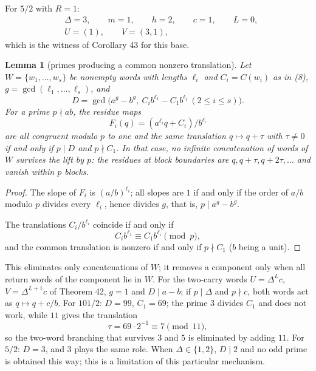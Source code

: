 \documentclass[11pt,reqno]{amsart}
\newtheorem{lemma}[theorem]{Lemma}
\theoremstyle{definition}
\theoremstyle{remark}
\begin{document}
For \(5/2\) with \(R=1\):
\[
\begin{aligned}
&\Delta=3,\qquad m=1,\qquad h=2,\qquad c=1,\qquad L=0,\\
&U=(1),\qquad V=(3,1),
\end{aligned}
\]
which is the witness of
Corollary 43 for this base.

\begin{samepage}
\begin{lemma}[primes producing a common nonzero translation]\leavevmode\label{thm:72}
Let
\(W=\{w_1,\ldots,w_s\}\) be nonempty words with lengths \(\ell_i\) and
\(C_i=C(w_i)\) as in (8), \(g=\gcd(\ell_1,\ldots,\ell_s)\), and
\[
D=\gcd\bigl(a^g-b^g,\ C_ib^{\ell_1}-C_1b^{\ell_i}\ (2\le i\le s)\bigr).
\]
For a prime \(p\nmid ab\), the residue maps
\[
F_i(q)=(a^{\ell_i}q+C_i)/b^{\ell_i}
\]
are all congruent modulo \(p\)
to one and the same translation \(q\mapsto q+\tau\) with \(\tau\ne0\) if
and only if \(p\mid D\) and \(p\nmid C_1\). In that case, no infinite
concatenation of words of \(W\) survives the lift by \(p\): the residues
at block boundaries are \(q,q+\tau,q+2\tau,\ldots\) and vanish within
\(p\) blocks.
\label{thm-end:72}
\end{lemma}
\end{samepage}

\begin{proof}\leavevmode\label{proof:72}
The slope of \(F_i\) is \((a/b)^{\ell_i}\); all slopes are
\(1\) if and only if the order of \(a/b\) modulo \(p\) divides every
\(\ell_i\), hence divides \(g\), that is, \(p\mid a^g-b^g\).

The
translations \(C_i/b^{\ell_i}\) coincide if and only if
\[
C_ib^{\ell_1}\equiv C_1b^{\ell_i}\pmod p,
\]
and the common translation
is nonzero if and only if \(p\nmid C_1\) (\(b\) being a unit). \qedhere
\end{proof}

This eliminates only concatenations of \(W\); it removes a component only
when all return words of the component lie in \(W\). For the two-carry
words \(U=\Delta^Lc\), \(V=\Delta^{L+1}c\) of Theorem 42, \(g=1\) and
\(D\mid a-b\); if \(p\mid\Delta\) and \(p\nmid c\), both words act as
\(q\mapsto q+c/b\). For \(101/2\): \(D=99\), \(C_1=69\); the prime
\(3\) divides \(C_1\) and does not work, while \(11\) gives the
translation
\[
\tau=69\cdot2^{-1}\equiv7\pmod{11},
\]
so the two-word
branching that survives \(3\) and \(5\) is eliminated by adding \(11\).
For \(5/2\): \(D=3\), and \(3\) plays the same role. When \(\Delta\in
\{1,2\}\), \(D\mid2\) and no odd prime is obtained this way; this is a
limitation of this particular mechanism.
\end{document}
